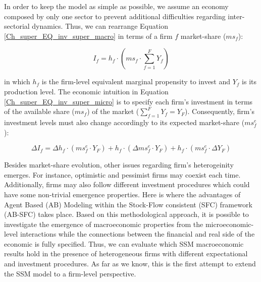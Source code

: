 \documentclass{SelfArx}
\begin{document}
In order to keep the model as simple as possible, we assume an economy composed by only one sector to prevent additional difficulties regarding inter-sectorial dynamics.
Thus, we can rearrange Equation \ref{Ch_super_EQ_inv_super_macro} in terms of a firm \(f\) market-share (\(ms_{f}\)):
\begin{latex}
\begin{equation}
\label{Ch_super_EQ_inv_super_micro}
I_{f} = h_{f}\cdot \left(ms_{f}\cdot\sum_{f=1}^{F}Y_{f}\right)
\end{equation}
\end{latex}
in which \(h_{f}\) is the firm-level equivalent marginal propensity to invest and \(Y_{f}\) is its production level.
The economic intuition in Equation \ref{Ch_super_EQ_inv_super_micro} is to specify each firm's investment in terms of the available share (\(ms_{f}\)) of the market (\(\sum_{f=1}^{F}Y_{f} = Y_{F}\)).
Consequently, firm's investment levels must also change accordingly to its expected market-share (\(ms^{e}_{f}\)):
\begin{latex}
\begin{equation}
\Delta I_{f} = \Delta h_{f}\cdot(ms^{e}_{f}\cdot Y_{F}) + h_{f}\cdot(\Delta ms^{e}_{f}\cdot Y_{F}) + h_{f}\cdot (ms^{e}_{f}\cdot \Delta Y_{F})
\end{equation}
\end{latex}

Besides market-share evolution, other issues regarding firm's heterogeinity emerges.
For instance, optimistic and pessimist firms may coexist each time.
Additionally, firms may also follow different investment procedures which could have some non-trivial emergence properties.
Here is where the advantages of Agent Based (AB) Modeling within the Stock-Flow consistent (SFC) framework (AB-SFC) takes place.
Based on this methodological approach, it is possible to investigate the emergence of macroeconomic properties from the microeconomic-level interactions while the connections between the financial and real side of the economic is fully specified.
Thus, we can evaluate which SSM macroeconomic results hold in the presence of heterogeneous firms with different expectational and investment procedures.
As far as we know, this is the first attempt to extend the SSM model to a firm-level perspective.
\end{document}
